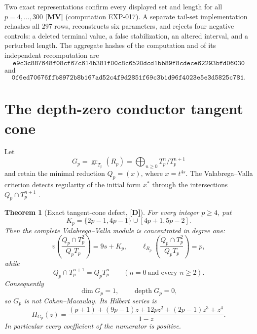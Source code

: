 \documentclass[11pt]{article}
\newtheorem{theorem}{Theorem}[section]
\theoremstyle{definition}
\theoremstyle{remark}
\begin{document}
Two exact representations confirm every displayed set and length for all $p=4,\ldots,300$
\textbf{[MV]} (computation EXP-017). A separate tail-set implementation rehashes all $297$ rows,
reconstructs six parameters, and rejects four negative controls: a deleted terminal value, a false
stabilization, an altered interval, and a perturbed length. The aggregate hashes of the
computation and of its independent recomputation are
\[
\texttt{e9c3c887648f08cf67c614b381f00c8c6520dcd1bb89f8cdece62293bfd06030}
\]
and
\[
\texttt{0f6ed70676ffb8972b8b167ad52c4f9d2851f69c3b1d96f4023e5e3d5825c781}.
\]

\section{The depth-zero conductor tangent cone}

Let
\[
G_p=\operatorname{gr}_{T_p}(R_p)=\bigoplus_{n\ge0}T_p^n/T_p^{n+1}
\]
and retain the minimal reduction $Q_p=(x)$, where $x=t^{4s}$. The
Valabrega--Valla criterion detects regularity of the initial form $x^*$ through the intersections
$Q_p\cap T_p^{n+1}$ \cite{ValabregaValla1978}.

\begin{theorem}[Exact tangent-cone defect, {\bf[D]}]\label{thm:tangent}
For every integer $p\ge4$, put
\[
K_p=\{2p-1,4p-1\}\cup[4p+1,5p-2].
\]
Then the complete Valabrega--Valla module is concentrated in degree one:
\[
v\!\left(\frac{Q_p\cap T_p^2}{Q_pT_p}\right)=9s+K_p,
\qquad
\ell_{R_p}\!\left(\frac{Q_p\cap T_p^2}{Q_pT_p}\right)=p,
\]
while
\[
Q_p\cap T_p^{n+1}=Q_pT_p^n
\qquad(n=0\ \text{and every }n\ge2).
\]
Consequently
\[
\dim G_p=1,\qquad \operatorname{depth}G_p=0,
\]
so $G_p$ is not Cohen--Macaulay. Its Hilbert series is
\[
H_{G_p}(z)=
\frac{(p+1)+(9p-1)z+12pz^2+(2p-1)z^3+z^4}{1-z}.
\]
In particular every coefficient of the numerator is positive.
\end{theorem}
\end{document}
